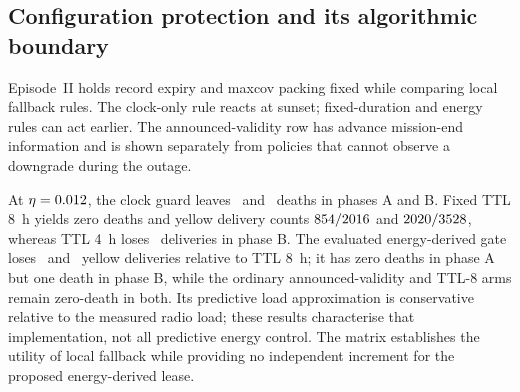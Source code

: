 \documentclass[journal,10pt]{IEEEtran}
\begin{document}
\begin{table}[t]
\centering\small
\caption{Ten-seed Episode~I sweep with the strong maxcov chooser fixed; only the edge disposition
changes. The earlier gateway-only suppression witness is omitted because its sign flips under the
corrected gateway deadline boundary and is not used for the claim. $^{\dagger}$standard BPv7-style
per-record lifetime; $^{\ddagger}$obligation-keyed purge, bit-identical to $^{\dagger}$.}
\label{tab:purgeexpiry}
\setlength{\tabcolsep}{3.5pt}\footnotesize

\end{table}

\subsection{Configuration protection and its algorithmic boundary}
\label{sec:eval-lease}
Episode~II holds record expiry and maxcov packing fixed while comparing local fallback rules.
The clock-only rule reacts at sunset; fixed-duration and energy rules can act earlier. The
announced-validity row has advance mission-end information and is shown separately from policies
that cannot observe a downgrade during the outage.

\begin{table}[t]
\centering\small
\caption{Configuration fallback across two outage phases (\cFiveSeeds\ seeds,
\texttt{generic-expiry} and maxcov fixed). TTLs start at dense application. The announced-validity
row has Task~1 information; the remaining adaptive/TTL policies use Task~2 information.
The three reported energy variants have identical cell outcomes, so one row represents them.
Zero observed deaths is not a universal survival guarantee.}
\label{tab:lease}

\end{table}

At $\eta=0.012$, the clock guard leaves \cFiveNightfloorDeadA\ and
\cFiveNightfloorDeadB\ deaths in phases A and B. Fixed TTL 8~h yields zero deaths and yellow
delivery counts $854/2016$ and
$2020/3528$, whereas TTL 4~h loses
\cFiveTtlFourLostB\ deliveries in phase B. The evaluated energy-derived gate loses
\cFiveEnergyLostA\ and \cFiveEnergyLostB\ yellow deliveries relative to TTL 8~h; it has zero
deaths in phase A but one death in phase B, while the ordinary announced-validity and TTL-8 arms
remain zero-death in both. Its predictive load approximation is conservative relative to the measured radio load;
these results characterise that implementation, not all predictive energy control.
The matrix establishes the utility of local fallback while providing no independent increment
for the proposed energy-derived lease.
\end{document}
